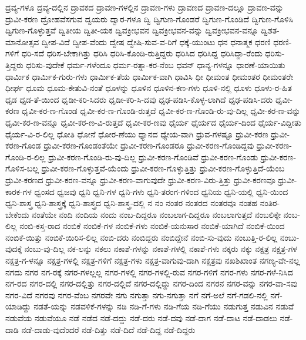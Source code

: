 {ದ್ರವ್ಯ-ಗಳೂ
ದ್ರವ್ಯ-ದಲ್ಲಿನ
ದ್ರಾವಕದ
ದ್ರಾವಣ-ಗಳಲ್ಲಿನ
ದ್ರಾವಣ-ಗಳು
ದ್ರಾವಣದ
ದ್ರಾವಣ-ದಲ್ಲೂ
ದ್ರಾವಣ-ವನ್ನು
ದ್ರುವೀ-ಕರಣ
ದ್ರೋಹವೆಸಗುವ
ದ್ವಯರು
ದ್ವಾರ-ಗಳೂ
ದ್ವಿ
ದ್ವಿಗುಣ-ಗೊಂಡರೆ
ದ್ವಿಗುಣ-ಗೊಂಡಿದೆ
ದ್ವಿಗುಣ-ಗೊಳಿಸಿ
ದ್ವಿಗುಣ-ಗೊಳ್ಳುತ್ತವೆ
ದ್ವಿತೀಯ
ದ್ವಿತೀ-ಯಕ
ದ್ವಿವಕ್ರೀಭವನ
ದ್ವಿವಕ್ರೀಭವನ-ವನ್ನು
ದ್ವಿವಕ್ರೀಭವನ-ವನ್ನೂ
ದ್ವಿಶತ-ಮಾನೋತ್ಸವ
ದ್ವೀಪ-ವಿದೆ
ದ್ವೀಪ-ವೆಂದು
ದ್ವೇಷ
ದ್ವೇಷಿ-ಸುವ-ವ-ರಿಗೆ
ಧಕ್ಕೆ-ಯುಂಟು
ಧನ
ಧನಾತ್ಮಕ
ಧರಣಿ
ಧರಣಿ-ಗಳಿಗೆ
ಧರಿ-ಸದೆ
ಧರಿಸ-ಬೇಕಾಗಿತ್ತು
ಧರಿಸಿ
ಧರಿಸಿ-ಕೊಂಡಿ-ರುತ್ತಿದ್ದರು
ಧರಿಸಿದ
ಧರಿಸಿದ್ದ
ಧರಿಸಿದ್ದಾ-ರೆಂದು
ಧರಿಸು-ತ್ತಿದ್ದರು
ಧರಿಸು-ವುದೇಕೆ
ಧರ್ಮ-ಗಳೆಂದೂ
ಧರ್ಮ-ರತ್ನಾ-ಕರ-ನೆಂಬ
ಧವನ್
ಧಾನ್ಯ-ಗಳನ್ನೂ
ಧಾರಣೆ-ಯಾಯಿತು
ಧಾರ್ಮಿಕ
ಧಾರ್ಮಿಕ-ಗುರು-ಗಳು
ಧಾರ್ಮಿಕ-ತೆಯ
ಧಾರ್ಮಿಕ-ವಾಗಿ
ಧಾವಿಸಿ
ಧೀ
ಧೀಮಂತ
ಧೀಮಂತರ
ಧೀಮಂತರೇ
ಧೀರ್ಘ
ಧೂಮ
ಧೂಮ-ಕೇತುವಿ-ನಂತೆ
ಧೂಳನ್ನು
ಧೂಳಿನ
ಧೂಳಿನ-ಕಣ-ಗಳು
ಧೂಳಿ-ನಲ್ಲಿ
ಧೂಳು
ಧೂಳು-ರ-ಹಿತ
ಧೃಡ
ಧೃಡ-ತೆ-ಯಿಂದ
ಧೃಡೀ-ಕರಿ-ಸಿದರು
ಧೃಡೀ-ಕರಿ-ಸಿ-ದವು
ಧೃಢ-ಪಡಿಸಿ-ಕೊಳ್ಳ-ಲಾಗಿದೆ
ಧೃಢ-ಪಡಿಸಿ-ದರು
ಧೃವೀ-ಕರಣ
ಧೃವೀ-ಕರ-ಣ-ಗೊಂಡ
ಧೃವೀ-ಕರ-ಣ-ಗೊಂಡಿ-ರುತ್ತದೆ
ಧೃವೀ-ಕರ-ಣ-ಗೊಂಡಿ-ರು-ವು-ದಿಲ್ಲ
ಧೃವೀ-ಕರ-ಣ-ವನ್ನು
ಧೃವೀ-ಕರ-ಣ-ವನ್ನೂ
ಧೃವೀ-ಕರ-ಣ-ವಿ-ರುತ್ತದೆ
ಧೃವೀ-ಕರ-ಣವು
ಧೈರ್ಯ
ಧೈರ್ಯದ
ಧೈರ್ಯ-ದಿಂದ
ಧೈರ್ಯ-ವಿದ್ದೀತು
ಧೈರ್ಯ-ವಿ-ರ-ಲಿಲ್ಲ
ಧೋತಿ
ಧೋನೆ
ಧೋರ-ಣೆಯು
ಧ್ಯಾನದ
ಧ್ಯೇಯ-ವಾಗಿ
ಧ್ರುವ-ಗಳಷ್ಟೂ
ಧ್ರುವೀ-ಕರಣ
ಧ್ರುವೀ-ಕರಣ-ಗೊಂಡ
ಧ್ರುವೀ-ಕರಣ-ಗೊಂಡಂತೆಯೇ
ಧ್ರುವೀ-ಕರಣ-ಗೊಂಡರೂ
ಧ್ರುವೀ-ಕರಣ-ಗೊಂಡಿದ್ದವು
ಧ್ರುವೀ-ಕರಣ-ಗೊಂಡಿ-ರ-ಲಿಲ್ಲ
ಧ್ರುವೀ-ಕರಣ-ಗೊಂಡಿ-ರು-ವು-ದಿಲ್ಲ
ಧ್ರುವೀ-ಕರಣ-ಗೊಂಡಿವೆ
ಧ್ರುವೀ-ಕರಣ-ಗೊಂಡು
ಧ್ರುವೀ-ಕರಣ-ಗೊಳಿಸ-ಬಲ್ಲ
ಧ್ರುವೀ-ಕರಣ-ಗೊಳ್ಳುತ್ತವೆ-ಯೆಂದು
ಧ್ರುವೀ-ಕರಣ-ಗೊಳ್ಳುತ್ತಿತ್ತು
ಧ್ರುವೀ-ಕರಣ-ಗೊಳ್ಳುತ್ತಿದೆ-ಯೆಂಬ
ಧ್ರುವೀ-ಕರಣದ
ಧ್ರುವೀ-ಕರಣ-ವನ್ನೂ
ಧ್ರುವೀ-ಕರಣ-ವಾಗುವುದೇ
ಧ್ರುವೀ-ಕರಣ-ವಿರು-ತ್ತಿತ್ತು
ಧ್ರುವೀ-ಕರಣವೂ
ಧ್ರುವೀ-ಕಾರಕ-ಗಳ
ಧ್ವಂಸದ
ಧ್ವಜವು
ಧ್ವನಿ
ಧ್ವನಿ-ಗಳ
ಧ್ವನಿ-ಗಳು
ಧ್ವನಿ-ತರಂಗ-ಗಳಿಂದ
ಧ್ವನಿಯ
ಧ್ವನಿ-ಯಲ್ಲಿ
ಧ್ವನಿ-ಯಿಂದ
ಧ್ವನಿ-ಶಾಸ್ತ್ರ
ಧ್ವನಿ-ಶಾಸ್ತ್ರಕ್ಕೆ
ಧ್ವನಿ-ಶಾಸ್ತ್ರದ
ಧ್ವನಿ-ಶಾಸ್ತ್ರ-ದಲ್ಲಿ
ನ
ನಂ
ನಂತರ
ನಂತರದ
ನಂತರವೂ
ನಂತಹ
ನಂತಿರ-ಬೇಕೆಂದು
ನಂತೆಯೇ
ನಂದಿ
ನಂದಿಯ
ನಂದು
ನಂಬ-ದಿದ್ದರೂ
ನಂಬಲಾಗ-ದಿದ್ದರೂ
ನಂಬಲಾಗುತ್ತದೆ
ನಂಬಲಿಕ್ಕೇ
ನಂಬ-ಲಿಲ್ಲ
ನಂಬಿ-ಕಸ್ತ-ರಾದ
ನಂಬಿಕೆ
ನಂಬಿಕೆ-ಗಳ
ನಂಬಿಕೆ-ಗಳು
ನಂಬಿಕೆ-ಯನುಸಾರ
ನಂಬಿಕೆ-ಯಾಗಿದೆ
ನಂಬಿಕೆ-ಯಿಂದ
ನಂಬಿಕೆ-ಯಿತ್ತು
ನಂಬಿಕೆ-ಯಿರಿಸ-ಲಿಲ್ಲ
ನಂಬಿ-ದರು
ನಂಬಿದ್ದರು
ನಂಬಿದ್ದೇನೆ
ನಂಬಿ-ಸು-ವುದು
ನಂಬುತ್ತಿ-ರ-ಲಿಲ್ಲ
ನಂಬು-ವುದಕ್ಕೆ
ನಂಬು-ವು-ದಿಲ್ಲ
ನಕ-ಲನ್ನು
ನಕಲು
ನಕಾಶೆ-ಗಳನ್ನು
ನಕಾಶೆ-ಗಳಲ್ಲಿ
ನಕಾಶೆ-ಗಳು
ನಕ್ಕರು
ನಕ್ಕು
ನಕ್ಷತ್ರ
ನಕ್ಷತ್ರ-ಗಳ
ನಕ್ಷತ್ರ-ಗ-ಳನ್ನೂ
ನಕ್ಷತ್ರ-ಗಳಲ್ಲಿ
ನಕ್ಷತ್ರ-ಗಳಿಗೆ
ನಕ್ಷತ್ರ-ಗಳು
ನಕ್ಷತ್ರ-ವಾಗುವು-ದಾಗಿ
ನಕ್ಷತ್ರವು
ನಖಶಿಖಾಂತ
ನಗಣ್ಯ-ವೇ-ನಲ್ಲ
ನಗದು
ನಗರ
ನಗ-ರಕ್ಕೆ
ನಗರ-ಗಳಲ್ಲಲ್ಲ
ನಗರ-ಗಳಲ್ಲಿ
ನಗರ-ಗಳಲ್ಲಿ-ರುವ
ನಗರ-ಗಳಿಗೆ
ನಗರ-ಗಳು
ನಗರ-ಗಳೆ-ನಿಸಿದ
ನಗ-ರದ
ನಗರ-ದಲ್ಲಿ
ನಗರ-ದಲ್ಲಿತ್ತು
ನಗರ-ದಲ್ಲಿದೆ
ನಗರ-ದಲ್ಲಿದ್ದು
ನಗರ-ದಿಂದ
ನಗರನ
ನಗರ-ವನ್ನು
ನಗರ-ವಾ-ಸವು
ನಗರ-ವಿದೆ
ನಗರವು
ನಗರ-ವೆಂಬ
ನಗರವೇ
ನಗು
ನಗುತ್ತಾ
ನಗು-ನಗುತ್ತಾ
ನಗೆ
ನಗೆ-ಅಲೆ
ನಗೆ-ಗಡಲಿ-ನಲ್ಲಿ
ನಗೆ-ಯಾಡಿದ್ದು
ನಡತೆ-ಯನ್ನು
ನಡವಳಿಕೆ-ಗಳನ್ನು
ನಡಿ
ನಡಿ-ಗೆ-ಗಳು
ನಡಿ-ಗೆಯ
ನಡಿ-ಗೆಯು
ನಡುಗುತ್ತ
ನಡುವಿನ
ನಡುವೆ
ನಡುವೆಯ
ನಡುವೆಯೂ
ನಡೆ
ನಡೆದ
ನಡೆ-ದದ್ದು
ನಡೆ-ದರು
ನಡೆ-ದವು
ನಡೆ-ದಾಗ
ನಡೆ-ದಾಟ
ನಡೆ-ದಾಡಲು
ನಡೆ-ದಾಡಿ
ನಡೆ-ದಾಡು-ವುದೆಂದರೆ
ನಡೆ-ದಿತ್ತು
ನಡೆ-ದಿದೆ
ನಡೆ-ದಿದ್ದ
ನಡೆ-ದಿದ್ದರು
}
